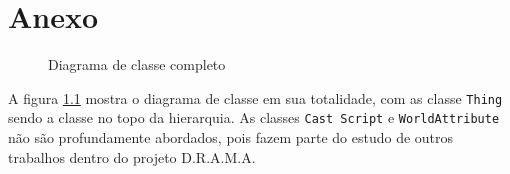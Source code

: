 \appendix
\chapter{Anexo}
\begin{figure}[htb]
	\centering
	\caption{Diagrama de classe completo}
	\label{fig:digcomp}
\end{figure}

A figura \ref{fig:digcomp} mostra o diagrama de classe em sua totalidade, com as classe \texttt{Thing} sendo a classe no topo da hierarquia. As classes \texttt{Cast Script} e \texttt{WorldAttribute} não são profundamente abordados, pois fazem parte do estudo de outros trabalhos dentro do projeto D.R.A.M.A.
